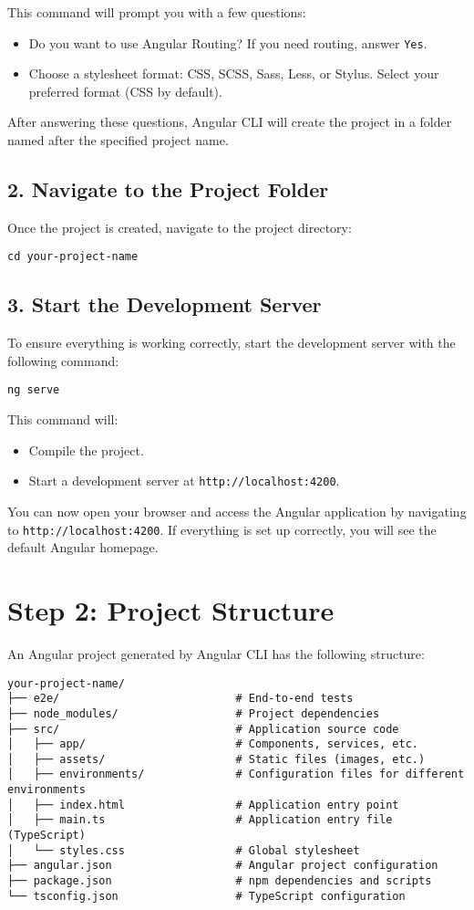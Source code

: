 \documentclass{article}
\begin{document}
This command will prompt you with a few questions:
\begin{itemize}
    \item Do you want to use Angular Routing? If you need routing, answer \texttt{Yes}.
    \item Choose a stylesheet format: CSS, SCSS, Sass, Less, or Stylus. Select your preferred format (CSS by default).
\end{itemize}

After answering these questions, Angular CLI will create the project in a folder named after the specified project name.

\subsection*{2. Navigate to the Project Folder}
Once the project is created, navigate to the project directory:
\begin{verbatim}
cd your-project-name
\end{verbatim}

\subsection*{3. Start the Development Server}
To ensure everything is working correctly, start the development server with the following command:
\begin{verbatim}
ng serve
\end{verbatim}

This command will:
\begin{itemize}
    \item Compile the project.
    \item Start a development server at \texttt{http://localhost:4200}.
\end{itemize}

You can now open your browser and access the Angular application by navigating to \texttt{http://localhost:4200}. If everything is set up correctly, you will see the default Angular homepage.

\section*{Step 2: Project Structure}
An Angular project generated by Angular CLI has the following structure:
\begin{verbatim}
your-project-name/
├── e2e/                           # End-to-end tests
├── node_modules/                  # Project dependencies
├── src/                           # Application source code
│   ├── app/                       # Components, services, etc.
│   ├── assets/                    # Static files (images, etc.)
│   ├── environments/              # Configuration files for different environments
│   ├── index.html                 # Application entry point
│   ├── main.ts                    # Application entry file (TypeScript)
│   └── styles.css                 # Global stylesheet
├── angular.json                   # Angular project configuration
├── package.json                   # npm dependencies and scripts
└── tsconfig.json                  # TypeScript configuration
\end{verbatim}
\end{document}

